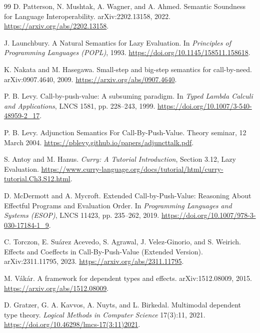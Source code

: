 \documentclass[11pt]{article}
\theoremstyle{definition}
\theoremstyle{remark}
\begin{document}
\begin{thebibliography}{99}
D. Patterson, N. Mushtak, A. Wagner, and A. Ahmed.
\newblock Semantic Soundness for Language Interoperability.
\newblock arXiv:2202.13158, 2022.
\newblock \url{https://arxiv.org/abs/2202.13158}.

J. Launchbury.
\newblock A Natural Semantics for Lazy Evaluation.
\newblock In \emph{Principles of Programming Languages (POPL)}, 1993.
\newblock \url{https://doi.org/10.1145/158511.158618}.

K. Nakata and M. Hasegawa.
\newblock Small-step and big-step semantics for call-by-need.
\newblock arXiv:0907.4640, 2009.
\newblock \url{https://arxiv.org/abs/0907.4640}.

P. B. Levy.
\newblock Call-by-push-value: A subsuming paradigm.
\newblock In \emph{Typed Lambda Calculi and Applications}, LNCS 1581,
  pp. 228--243, 1999.
\newblock \url{https://doi.org/10.1007/3-540-48959-2_17}.

P. B. Levy.
\newblock Adjunction Semantics For Call-By-Push-Value.
\newblock Theory seminar, 12 March 2004.
\newblock \url{https://pblevy.github.io/papers/adjuncttalk.pdf}.

S. Antoy and M. Hanus.
\newblock \emph{Curry: A Tutorial Introduction}, Section 3.12, Lazy Evaluation.
\newblock \url{https://www.curry-language.org/docs/tutorial/html/curry-tutorial.Ch3.S12.html}.

D. McDermott and A. Mycroft.
\newblock Extended Call-by-Push-Value: Reasoning About Effectful Programs and
  Evaluation Order.
\newblock In \emph{Programming Languages and Systems (ESOP)}, LNCS 11423,
  pp. 235--262, 2019.
\newblock \url{https://doi.org/10.1007/978-3-030-17184-1_9}.

C. Torczon, E. Su\'arez Acevedo, S. Agrawal, J. Velez-Ginorio, and S. Weirich.
\newblock Effects and Coeffects in Call-By-Push-Value (Extended Version).
\newblock arXiv:2311.11795, 2023.
\newblock \url{https://arxiv.org/abs/2311.11795}.

M. V\'ak\'ar.
\newblock A framework for dependent types and effects.
\newblock arXiv:1512.08009, 2015.
\newblock \url{https://arxiv.org/abs/1512.08009}.

D. Gratzer, G. A. Kavvos, A. Nuyts, and L. Birkedal.
\newblock Multimodal dependent type theory.
\newblock \emph{Logical Methods in Computer Science} 17(3):11, 2021.
\newblock \url{https://doi.org/10.46298/lmcs-17(3:11)2021}.


\end{thebibliography}
\end{document}
